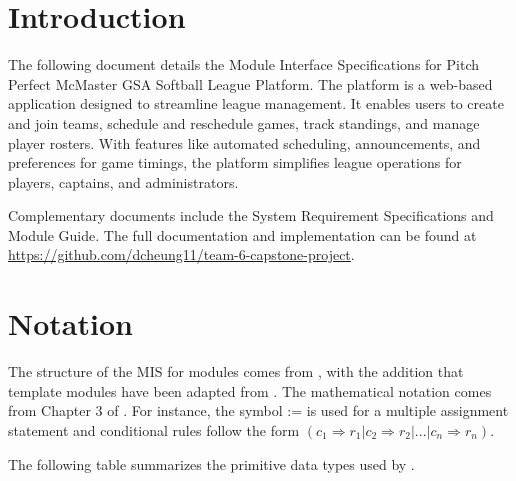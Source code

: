 \documentclass[12pt, titlepage]{article}
\begin{document}
\newpage

\tableofcontents

\newpage


\section{Introduction}

The following document details the Module Interface Specifications for
Pitch Perfect McMaster GSA Softball League Platform. The platform is a web-based application designed to streamline league management. It enables users to create and join teams, schedule and reschedule games, track standings, and manage player rosters. With features like automated scheduling, announcements, and preferences for game timings, the platform simplifies league operations for players, captains, and administrators.

Complementary documents include the System Requirement Specifications
and Module Guide.  The full documentation and implementation can be
found at \url{https://github.com/dcheung11/team-6-capstone-project}.

\section{Notation}

The structure of the MIS for modules comes from \citet{HoffmanAndStrooper1995},
with the addition that template modules have been adapted from
\cite{GhezziEtAl2003}.  The mathematical notation comes from Chapter 3 of
\citet{HoffmanAndStrooper1995}.  For instance, the symbol := is used for a
multiple assignment statement and conditional rules follow the form $(c_1
  \Rightarrow r_1 | c_2 \Rightarrow r_2 | ... | c_n \Rightarrow r_n )$.

The following table summarizes the primitive data types used by \progname.
\end{document}
